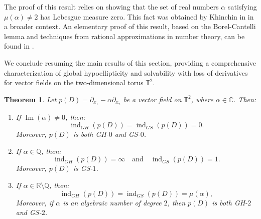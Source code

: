\documentclass[11pt]{amsart}
\numberwithin{equation}{section}
\newtheorem{theorem}{Theorem}[section]
\theoremstyle{definition}
\begin{document}
	The proof of this result relies on showing that the set of real numbers \( \alpha \) satisfying \( \mu(\alpha) \neq 2 \) has Lebesgue measure zero. This fact was obtained by Khinchin in \cite[Theorem 32]{Khinchin} in a broader context. An elementary proof of this result, based on the Borel-Cantelli lemma and techniques from rational approximations in number theory, can be found in \cite[Appendix E]{Bugeaud_2012}.

	We conclude resuming the main  results of this section, providing a comprehensive characterization of global hypoellipticity and solvability with loss of derivatives for vector fields on the two-dimensional torus $\mathbb{T}^2$.	
	
	\begin{theorem}\label{Thm-GHr-GSr-characterization}
		Let \( p(D) = \partial_{x_1} - \alpha \partial_{x_2} \) be a vector field on \( \mathbb{T}^2 \), where \( \alpha \in \mathbb{C} \). Then:
		\begin{enumerate}
			\item[{\it (i)}] If \( \operatorname{Im}(\alpha) \neq 0 \), then:
			\[
			\operatorname{ind}_{GH}(p(D)) = \operatorname{ind}_{GS}(p(D)) = 0.
			\]
			Moreover, \( p(D) \) is both GH-\( 0 \) and GS-\( 0 \).
			
			\item[{\it (ii)}] If \( \alpha \in \mathbb{Q} \), then:
			\[
			\operatorname{ind}_{GH}(p(D)) = \infty \quad \text{and} \quad \operatorname{ind}_{GS}(p(D)) = 1.
			\]
			Moreover, \( p(D) \) is GS-\( 1 \).
			
			\item[{\it (iii)}] If \( \alpha \in \mathbb{R} \setminus \mathbb{Q} \), then:
			\[
			\operatorname{ind}_{GH}(p(D)) = \operatorname{ind}_{GS}(p(D)) = \mu(\alpha),
			\]
			Moreover, if \( \alpha \) is an algebraic number of degree \( 2 \), then \( p(D) \) is both GH-\( 2 \) and GS-\( 2 \).
		\end{enumerate}
	\end{theorem}
	
\end{document}
